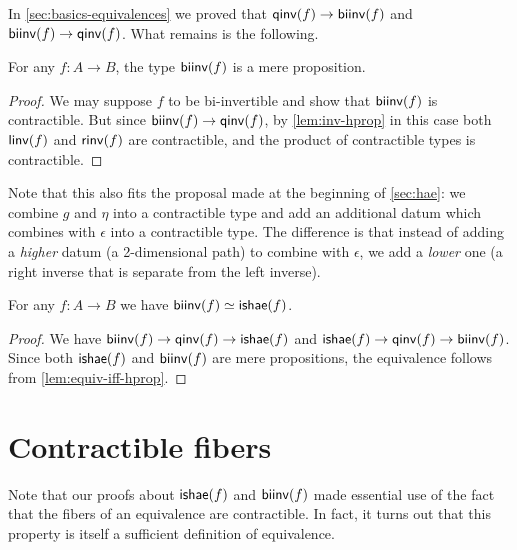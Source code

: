 In \cref{sec:basics-equivalences} we proved that $\mathsf{qinv}(f)\to\mathsf{biinv}(f)$ and $\mathsf{biinv}(f)\to\mathsf{qinv}(f)$.
What remains is the following.

\begin{thm}\label{thm:isprop-biinv}
  For any $f:A\to B$, the type $\mathsf{biinv}(f)$ is a mere proposition.
\end{thm}
\begin{proof}
  We may suppose $f$ to be bi-invertible and show that $\mathsf{biinv}(f)$ is contractible.
  But since $\mathsf{biinv}(f)\to\mathsf{qinv}(f)$, by \cref{lem:inv-hprop} in this case both $\mathsf{linv}(f)$ and $\mathsf{rinv}(f)$ are contractible, and the product of contractible types is contractible.
\end{proof}

Note that this also fits the proposal made at the beginning of \cref{sec:hae}: we combine $g$ and $\eta$ into a contractible type and add an additional datum which combines with $\epsilon$ into a contractible type.
The difference is that instead of adding a \emph{higher} datum (a 2-dimensional path) to combine with $\epsilon$, we add a \emph{lower} one (a right inverse that is separate from the left inverse).

\begin{cor}\label{thm:equiv-biinv-isequiv}
  For any $f:A\to B$ we have $\mathsf{biinv}(f) \simeq \mathsf{ishae}(f)$.
\end{cor}
\begin{proof}
  We have $\mathsf{biinv}(f) \to \mathsf{qinv}(f) \to \mathsf{ishae}(f)$ and $\mathsf{ishae}(f) \to \mathsf{qinv}(f) \to \mathsf{biinv}(f)$.
  Since both $\mathsf{ishae}(f)$ and $\mathsf{biinv}(f)$ are mere propositions, the equivalence follows from \cref{lem:equiv-iff-hprop}.
\end{proof}

%
%
%

\section{Contractible fibers}
\label{sec:contrf}

%
%
%

Note that our proofs about $\mathsf{ishae}(f)$ and $\mathsf{biinv}(f)$ made essential use of the fact that the fibers of an equivalence are contractible.
In fact, it turns out that this property is itself a sufficient definition of equivalence.

